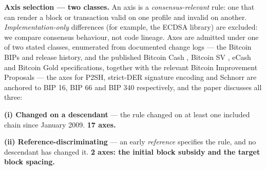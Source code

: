 \documentclass[
]{article}
\begin{document}
\textbf{Axis selection --- two classes.} An axis is a
\emph{consensus-relevant} rule: one that can render a block or
transaction valid on one profile and invalid on another.
\emph{Implementation-only} differences (for example, the ECDSA library)
are excluded: we compare consensus behaviour, not code lineage. Axes are
admitted under one of two stated classes, enumerated from documented
change logs --- the Bitcoin BIPs and release history, and the published
Bitcoin Cash \citep{bch_upgrades, bch_abla}, Bitcoin SV
\citep{bsv_genesis, bsv_chronicle}, eCash \citep{abc_src, xec_rtt} and
Bitcoin Gold \citep{btg_spec} specifications, together with the relevant
Bitcoin Improvement Proposals
\citep{bip16, bip34, bip65, bip66, bip112, bip141, bip340, bip341} ---
the axes for P2SH, strict-DER signature encoding and Schnorr are
anchored to BIP 16, BIP 66 and BIP 340 respectively, and the paper
discusses all three:

\textbf{(i) Changed on a descendant} --- the rule changed on at least
one included chain since January 2009. \textbf{17 axes.}

\textbf{(ii) Reference-discriminating} --- an early \emph{reference}
specifies the rule, and no descendant has changed it. \textbf{2 axes:
the initial block subsidy and the target block spacing.}
\end{document}
